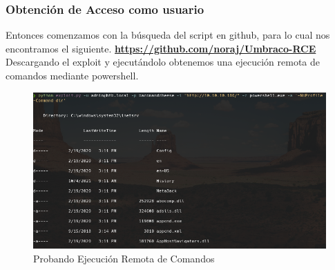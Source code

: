 \documentclass{article}
\begin{document}
\subsubsection{Obtención de Acceso como usuario}
Entonces comenzamos con la búsqueda del script en github, para lo cual nos encontramos el siguiente. \textbf{\href{https://github.com/noraj/Umbraco-RCE}{https://github.com/noraj/Umbraco-RCE}}
Descargando el exploit y ejecutándolo obtenemos una ejecución remota de comandos mediante powershell.
\begin{figure}[h]
	\center 
	\includegraphics[width=\textwidth]{images/remote/script-1.png}
	\caption{Probando Ejecución Remota de Comandos}
\end{figure}

\clearpage
\end{document}
